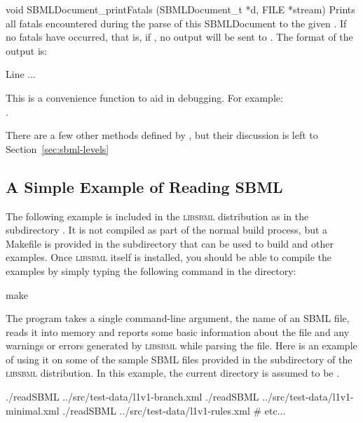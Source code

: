 \documentclass{sbmlmanual}
\newcommand{\libsbml}{\textsc{libsbml}}
\begin{document}
\begin{methoddef}{void SBMLDocument\_printFatals (SBMLDocument\_t *d,
FILE *stream)}
  Prints all fatals encountered during the parse of this SBMLDocument
  to the given .  If no fatals have occurred, that is, if
  , no output will be sent
  to . The format of the output is:
  \begin{example}
      Line %
      ...
  \end{example}
  This is a convenience function to aid in debugging.  For example:\\
  .
 \end{methoddef}

There are a few other methods defined by , but
their discussion is left to Section~\ref{sec:sbml-levels}


\subsection{A Simple Example of Reading SBML}
\label{sec:read-example}

The following example is included in the \libsbml{} distribution as
 in the subdirectory .  It is not
compiled as part of the normal build process, but a Makefile is provided in
the  subdirectory that can be used to build
 and other examples.  Once \libsbml{} itself is
installed, you should be able to compile the examples by simply typing the
following command in the  directory:

\begin{example}[csh]
  make
\end{example}

The  program takes a single command-line argument, the name
of an SBML file, reads it into memory and reports some basic information
about the file and any warnings or errors generated by \libsbml{} while
parsing the file.  Here is an example of using it on some of the sample
SBML files provided in the  subdirectory of the
\libsbml{} distribution.  In this example, the current directory is assumed
to be .

\begin{example}[csh]
  ./readSBML ../src/test-data/l1v1-branch.xml
  ./readSBML ../src/test-data/l1v1-minimal.xml
  ./readSBML ../src/test-data/l1v1-rules.xml
  # etc...
\end{example}
\end{document}
